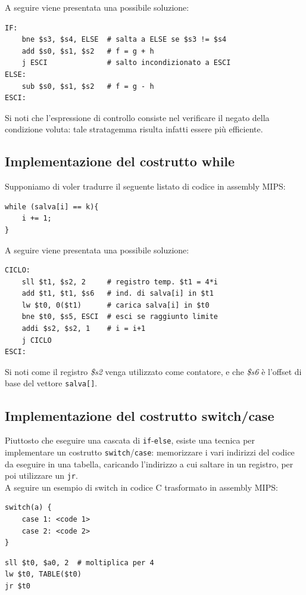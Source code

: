 \documentclass[class=book, crop=false]{standalone}
\begin{document}
A seguire viene presentata una possibile soluzione:
\begin{verbatim}
IF:
	bne $s3, $s4, ELSE  # salta a ELSE se $s3 != $s4
	add $s0, $s1, $s2   # f = g + h
	j ESCI              # salto incondizionato a ESCI
ELSE:
	sub $s0, $s1, $s2   # f = g - h
ESCI:
\end{verbatim}
Si noti che l'espressione di controllo consiste nel verificare il negato della condizione voluta: tale stratagemma risulta infatti essere più efficiente.

\subsection*{Implementazione del costrutto while}
Supponiamo di voler tradurre il seguente listato di codice in assembly MIPS:
\begin{verbatim}
while (salva[i] == k){
	i += 1;
}
\end{verbatim}

A seguire viene presentata una possibile soluzione:
\begin{verbatim}
CICLO:
	sll $t1, $s2, 2     # registro temp. $t1 = 4*i
	add $t1, $t1, $s6   # ind. di salva[i] in $t1
	lw $t0, 0($t1)      # carica salva[i] in $t0
	bne $t0, $s5, ESCI  # esci se raggiunto limite
	addi $s2, $s2, 1    # i = i+1
	j CICLO
ESCI:
\end{verbatim}
Si noti come il registro \emph{\$s2} venga utilizzato come contatore, e che \emph{\$s6} è l'offset di base del vettore \texttt{salva[]}.

\subsection*{Implementazione del costrutto switch/case}
Piuttosto che eseguire una cascata di \texttt{if}-\texttt{else}, esiste una tecnica per implementare un costrutto \texttt{switch}/\texttt{case}: memorizzare i vari indirizzi del codice da eseguire in una tabella, caricando l'indirizzo a cui saltare in un registro, per poi utilizzare un \texttt{jr}.\\
A seguire un esempio di switch in codice C trasformato in assembly MIPS:
\begin{verbatim}
switch(a) {
	case 1: <code 1>
	case 2: <code 2>
}
\end{verbatim}
\begin{verbatim}
sll $t0, $a0, 2  # moltiplica per 4
lw $t0, TABLE($t0)
jr $t0
\end{verbatim}
\end{document}
